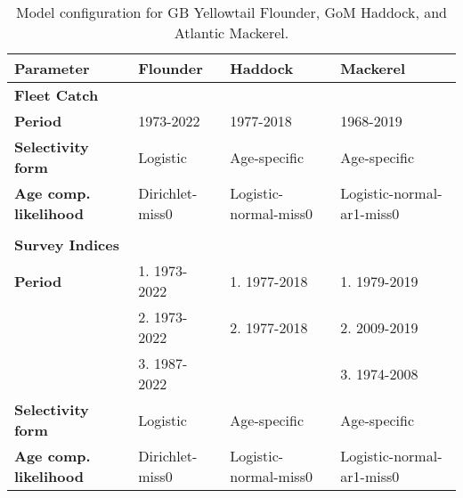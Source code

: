 \begin{table}[H]
\centering
\caption{Model configuration for GB Yellowtail Flounder, GoM Haddock, and Atlantic Mackerel.}
\label{model_config_table}
\begin{scriptsize} 
\begin{tabular}{p{4cm} p{3.5cm} p{3.5cm} p{3.5cm}} %
\toprule
\textbf{Parameter} & \textbf{Flounder} & \textbf{Haddock} & \textbf{Mackerel} \\
\midrule
\textbf{Fleet Catch} & & & \\
\textbf{Period} & 1973-2022 & 1977-2018 & 1968-2019 \\
\textbf{Selectivity form} & Logistic & Age-specific & Age-specific \\
\textbf{Age comp. likelihood} & Dirichlet-miss0 & Logistic-normal-miss0 & Logistic-normal-ar1-miss0 \\
 & & & \\
\textbf{Survey Indices} & & & \\
\textbf{Period} & 1. 1973-2022 & 1. 1977-2018 & 1. 1979-2019 \\
 & 2. 1973-2022 & 2. 1977-2018 & 2. 2009-2019 \\
 & 3. 1987-2022 & & 3. 1974-2008 \\
\textbf{Selectivity form} & Logistic & Age-specific & Age-specific \\
\textbf{Age comp. likelihood} & Dirichlet-miss0 & Logistic-normal-miss0 & Logistic-normal-ar1-miss0 \\
\bottomrule
\end{tabular}
\end{scriptsize}
\end{table}
